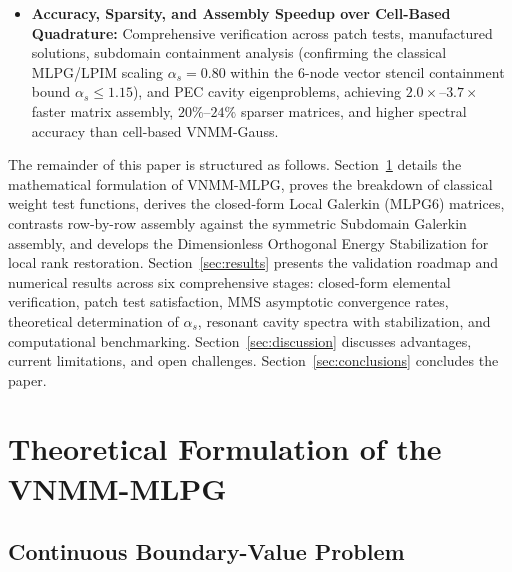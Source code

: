 \documentclass[preprint,12pt]{elsarticle}
\begin{document}
\begin{itemize}
    \item \textbf{Accuracy, Sparsity, and Assembly Speedup over Cell-Based Quadrature:} Comprehensive verification across patch tests, manufactured solutions, subdomain containment analysis (confirming the classical MLPG/LPIM scaling $\alpha_s = 0.80$ \cite{atluri2002meshless, liu2009mesh} within the 6-node vector stencil containment bound $\alpha_s \le 1.15$), and PEC cavity eigenproblems, achieving $2.0\times\text{--}3.7\times$ faster matrix assembly, $20\%\text{--}24\%$ sparser matrices, and higher spectral accuracy than cell-based VNMM-Gauss.
\end{itemize}

The remainder of this paper is structured as follows. Section~\ref{sec:formulation} details the mathematical formulation of VNMM-MLPG, proves the breakdown of classical weight test functions, derives the closed-form Local Galerkin (MLPG6) matrices, contrasts row-by-row assembly against the symmetric Subdomain Galerkin assembly, and develops the Dimensionless Orthogonal Energy Stabilization for local rank restoration. Section~\ref{sec:results} presents the validation roadmap and numerical results across six comprehensive stages: closed-form elemental verification, patch test satisfaction, MMS asymptotic convergence rates, theoretical determination of $\alpha_s$, resonant cavity spectra with stabilization, and computational benchmarking. Section~\ref{sec:discussion} discusses advantages, current limitations, and open challenges. Section~\ref{sec:conclusions} concludes the paper.

\section{Theoretical Formulation of the VNMM-MLPG}
\label{sec:formulation}

\subsection{Continuous Boundary-Value Problem}
\label{subsec:continuous_bvp}
\end{document}
